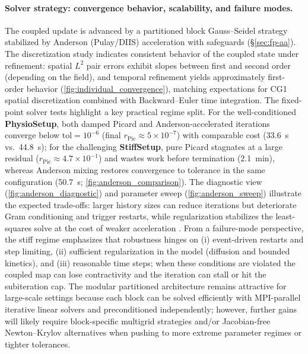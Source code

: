\paragraph{Solver strategy: convergence behavior, scalability, and failure modes.}
The coupled update is advanced by a partitioned block Gauss--Seidel strategy stabilized by Anderson (Pulay/DIIS) acceleration with safeguards (\S\ref{sec:fp-aa}).
The discretization study indicates consistent behavior of the coupled state under refinement: spatial $L^2$ pair errors exhibit slopes between first and second order (depending on the field), and temporal refinement yields approximately first-order behavior (\cref{fig:individual_convergence}), matching expectations for CG1 spatial discretization combined with Backward--Euler time integration.
The fixed-point solver tests highlight a key practical regime split.
For the well-conditioned \textbf{PhysioSetup}, both damped Picard and Anderson-accelerated iterations converge below $\mathrm{tol}=10^{-6}$ (final $r_{\mathrm{Pic}}\approx 5\times 10^{-7}$) with comparable cost (33.6~s vs.\ 44.8~s); for the challenging \textbf{StiffSetup}, pure Picard stagnates at a large residual ($r_{\mathrm{Pic}}\approx 4.7\times 10^{-1}$) and wastes work before termination (2.1~min), whereas Anderson mixing restores convergence to tolerance in the same configuration (50.7~s; \cref{fig:anderson_comparison}).
The diagnostic view (\cref{fig:anderson_diagnostic}) and parameter sweep (\cref{fig:anderson_sweep}) illustrate the expected trade-offs: larger history sizes can reduce iterations but deteriorate Gram conditioning and trigger restarts, while regularization stabilizes the least-squares solve at the cost of weaker acceleration \cite{Pulay1980_ConvergenceAcceleration,Walker2011_AndersonAcceleration,Toth2015_ConvergenceAnalysis}.
From a failure-mode perspective, the stiff regime emphasizes that robustness hinges on (i) event-driven restarts and step limiting, (ii) sufficient regularization in the model (diffusion and bounded kinetics), and (iii) reasonable time steps; when these conditions are violated the coupled map can lose contractivity and the iteration can stall or hit the subiteration cap.
The modular partitioned architecture remains attractive for large-scale settings because each block can be solved efficiently with MPI-parallel iterative linear solvers and preconditioned independently; however, further gains will likely require block-specific multigrid strategies and/or Jacobian-free Newton--Krylov alternatives when pushing to more extreme parameter regimes or tighter tolerances.

